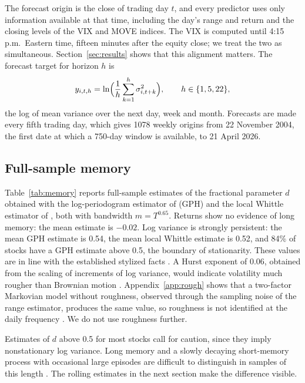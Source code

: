 The forecast origin is the close of trading day $t$, and every predictor
uses only information available at that time, including the day's range and
return and the closing levels of the VIX and MOVE indices. The VIX is
computed until 4:15 p.m.\ Eastern time, fifteen minutes after the equity
close; we treat the two as simultaneous. Section~\ref{sec:results} shows
that this alignment matters. The forecast target for horizon $h$ is
\begin{equation}
y_{i,t,h} = \ln\Bigl(\frac{1}{h}\sum_{k=1}^{h} \sigma^2_{i,t+k}\Bigr),
\qquad h \in \{1, 5, 22\},
\label{eq:target}
\end{equation}
the log of mean variance over the next day, week and month. Forecasts are
made every fifth trading day, which gives 1078 weekly origins from 22
November 2004, the first date at which a 750-day window is available, to 21
April 2026.

\subsection{Full-sample memory}

Table~\ref{tab:memory} reports full-sample estimates of the fractional
parameter $d$ obtained with the log-periodogram estimator of
\citet{geweke1983estimation} (GPH) and the local Whittle estimator of
\citet{robinson1995gaussian}, both with bandwidth $m=T^{0.65}$. Returns show
no evidence of long memory: the mean estimate is $-0.02$. Log variance is
strongly persistent: the mean GPH estimate is 0.54, the mean local Whittle
estimate is 0.52, and 84\% of stocks have a GPH estimate above 0.5, the
boundary of stationarity. These values are in line with the established
stylized facts \citep{andersen2003modeling}. A Hurst exponent of 0.06,
obtained from the scaling of increments of log variance, would indicate
volatility much rougher than Brownian motion
\citep{gatheral2018volatility}. Appendix~\ref{app:rough} shows that a
two-factor Markovian model without roughness, observed through the sampling
noise of the range estimator, produces the same value, so roughness is not
identified at the daily frequency \citep{cont2024rough}. We do not use
roughness further.



Estimates of $d$ above 0.5 for most stocks call for caution, since they
imply nonstationary log variance. Long memory and a slowly decaying
short-memory process with occasional large episodes are difficult to
distinguish in samples of this length \citep{diebold2001long,
granger2004occasional}. The rolling estimates in the next section make the
difference visible.
